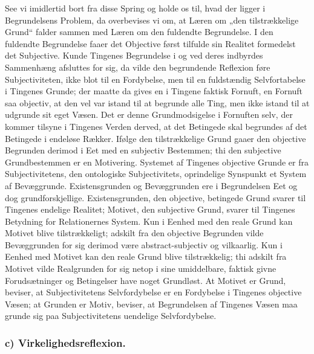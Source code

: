 \documentclass[11pt]{book}
\newcommand{\opage}[1]{\marginnote{\footnotesize\textit{[#1]}}}
\begin{document}
See vi imidlertid bort fra disse Spring og holde os til, hvad der
ligger i Begrundelsens Problem, da overbevises vi om, at Læren om
„den tilstrækkelige Grund“ falder sammen med Læren om den fuldendte
Begrundelse. I den fuldendte Begrundelse faaer det Objective først
tilfulde sin Realitet formedelst det Subjective. Kunde Tingenes
Begrundelse i og ved deres indbyrdes Sammenhæng afsluttes for sig,
da vilde den begrundende Reflexion føre Subjectiviteten, ikke blot
til en Fordybelse, men til en fuldstændig Selvfortabelse i Tingenes
Grunde; der maatte da gives en i Tingene faktisk Fornuft, en
Fornuft saa objectiv, at den vel var istand til at begrunde alle
Ting, men ikke istand til at udgrunde sit eget Væsen. Det er denne
Grundmodsigelse i Fornuften selv, der kommer tilsyne i Tingenes
Verden derved, at det Betingede skal begrundes af det Betingede i
endeløse Rækker. Ifølge den tilstrækkelige Grund gaaer den
objective Begrunden derimod i Eet med en subjectiv Bestemmen; thi
den subjective Grundbestemmen er en Motivering. Systemet af
Tingenes objective Grunde er fra Subjectivitetens, den ontologiske
Subjectivitets, oprindelige Synspunkt et System af Bevæggrunde.
Existensgrunden og Bevæggrunden ere i Begrundelsen Eet og dog
grundforskjellige. Existensgrunden, den objective, betingede Grund
svarer til Tingenes endelige Realitet; Motivet, den subjective
Grund, svarer til Tingenes Betydning for Relationernes System. Kun
i Eenhed med den reale Grund kan Motivet blive tilstrækkeligt;
adskilt fra den objective Begrunden vilde Bevæggrunden for sig
derimod være abstract-subjectiv og vilkaarlig.
Kun i Eenhed
med Motivet kan den reale Grund blive tilstrækkelig; thi adskilt
fra Motivet vilde Realgrunden for sig netop i sine umiddelbare,
faktisk givne Forudsætninger og Betingelser have noget Grundløst.
At Motivet er Grund, beviser, at Subjectivitetens Selvfordybelse
\opage{105} \setcounter{footnote}{0}%
er en Fordybelse i Tingenes objective Væsen; at Grunden er Motiv,
beviser, at Begrundelsen af Tingenes Væsen maa grunde sig paa
Subjectivitetens uendelige Selvfordybelse.

\subsubsection*{c) Virkelighedsreflexion.}
\end{document}

